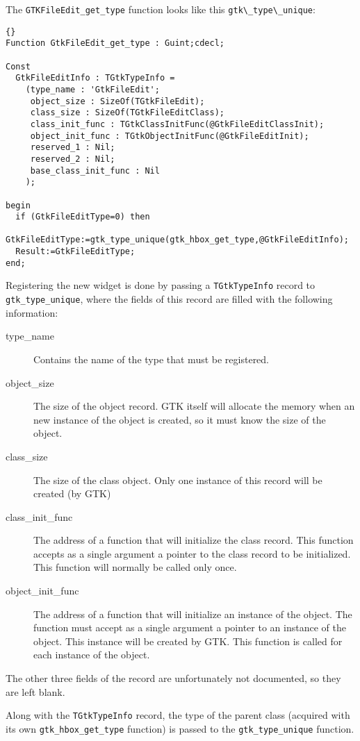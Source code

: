 \documentclass[10pt]{article}
\begin{document}
The \lstinline|GTKFileEdit_get_type| function looks like this
\lstinline|gtk\_type\_unique|:
\begin{lstlisting}{}
Function GtkFileEdit_get_type : Guint;cdecl;

Const
  GtkFileEditInfo : TGtkTypeInfo =
    (type_name : 'GtkFileEdit';   
     object_size : SizeOf(TGtkFileEdit);
     class_size : SizeOf(TGtkFileEditClass);
     class_init_func : TGtkClassInitFunc(@GtkFileEditClassInit);
     object_init_func : TGtkObjectInitFunc(@GtkFileEditInit);   
     reserved_1 : Nil;
     reserved_2 : Nil;
     base_class_init_func : Nil
    );

begin
  if (GtkFileEditType=0) then
    GtkFileEditType:=gtk_type_unique(gtk_hbox_get_type,@GtkFileEditInfo);
  Result:=GtkFileEditType;  
end;
\end{lstlisting}
Registering the new widget is done by passing a \lstinline|TGtkTypeInfo| 
record to \lstinline|gtk_type_unique|, where the fields of this record 
are filled with the following information:
\begin{description}
\item[type\_name] Contains the name of the type that must be registered. 
\item[object\_size] The size of the object record. GTK itself will allocate 
the memory when an new instance of the object is created, so it must know the
size of the object.  
\item[class\_size] The size of the class object. Only one instance of this
record will be created (by GTK)
\item[class\_init\_func] The address of a function that will initialize the
class record. This function accepts as a single argument a pointer to the
class record to be initialized. This function will normally be called only
once.
\item[object\_init\_func] The address of a function that will initialize 
an instance of the object. The function must accept as a single argument
a pointer to an instance of the object. This instance will be created by 
GTK. This function is called for each instance of the object.
\end{description}
The other three fields of the record are unfortunately not documented, so
they are left blank. 

Along with the \lstinline|TGtkTypeInfo| record, the type of the 
parent class (acquired with its own \lstinline|gtk_hbox_get_type| 
function) is passed to the \lstinline|gtk_type_unique| function. 
\end{document}
